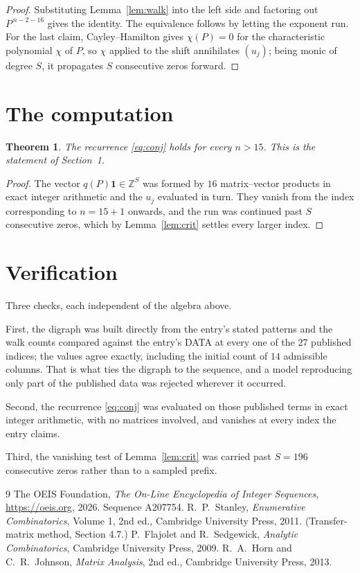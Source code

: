 \documentclass[11pt,a4paper]{article}
\theoremstyle{plain}
\newtheorem{theorem}{Theorem}
\theoremstyle{definition}
\begin{document}
\begin{proof}
Substituting Lemma~\ref{lem:walk} into the left side and factoring out
$P^{\,n-2-16}$ gives the identity. The equivalence follows by letting the exponent
run. For the last claim, Cayley--Hamilton gives $\chi(P)=0$ for the characteristic
polynomial $\chi$ of $P$, so $\chi$ applied to the shift annihilates $(u_j)$; being monic of
degree $S$, it propagates $S$ consecutive zeros forward.
\end{proof}

\section{The computation}

\begin{theorem}
The recurrence \eqref{eq:conj} holds for every $n>15$. This is the statement of
Section~1.
\end{theorem}

\begin{proof}
The vector $q(P)\mathbf{1}\in\mathbb{Z}^{S}$ was formed by $16$ matrix--vector
products in exact integer arithmetic and the $u_j$ evaluated in turn. They vanish from the
index corresponding to $n=15+1$ onwards, and the run was continued past $S$ consecutive
zeros, which by Lemma~\ref{lem:crit} settles every larger index.
\end{proof}

\section{Verification}

Three checks, each independent of the algebra above.

First, the digraph was built directly from the entry's stated patterns and the walk counts
compared against the entry's DATA at every one of the $27$ published indices; the
values agree exactly, including the initial count of $14$ admissible columns. That is
what ties the digraph to the sequence, and a model reproducing only part of the published
data was rejected wherever it occurred.

Second, the recurrence \eqref{eq:conj} was evaluated on those published terms in exact
integer arithmetic, with no matrices involved, and vanishes at every index the entry claims.

Third, the vanishing test of Lemma~\ref{lem:crit} was carried past $S=196$ consecutive
zeros rather than to a sampled prefix.

\begin{thebibliography}{9}
 The OEIS Foundation, \emph{The On-Line Encyclopedia of Integer
Sequences}, \url{https://oeis.org}, 2026. Sequence A207754.
 R.~P.~Stanley, \emph{Enumerative Combinatorics}, Volume 1, 2nd ed.,
Cambridge University Press, 2011. (Transfer-matrix method, Section 4.7.)
 P.~Flajolet and R.~Sedgewick, \emph{Analytic Combinatorics}, Cambridge
University Press, 2009.
 R.~A.~Horn and C.~R.~Johnson, \emph{Matrix Analysis}, 2nd ed., Cambridge
University Press, 2013.
\end{thebibliography}
\end{document}
